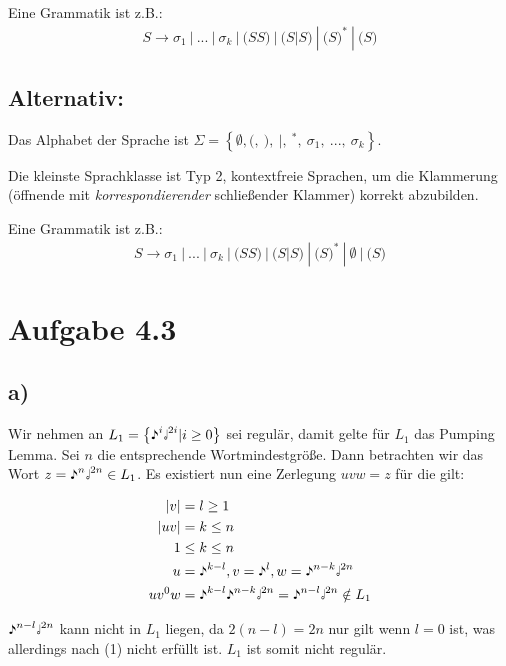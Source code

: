 \documentclass{article}
\begin{document}
Eine Grammatik ist z.B.:
\begin{align*}
S \rightarrow \sigma_1\ |\ ...\ |\ \sigma_k\ |\ \texttt{(}SS\texttt{)}\ |\ \texttt{(}S\texttt{|}S\texttt{)}\ |\ \texttt{(}S\texttt{)}^\texttt{*}\ |\ \texttt{(}S\texttt{)}
\end{align*}

\subsection*{Alternativ:}
Das Alphabet der Sprache ist $\Sigma = \left\{ \emptyset, \texttt{(},\ \texttt{)},\ \texttt{|},\ { }^\texttt{*},\ \sigma_1,\ ...,\ \sigma_k \right\}$.

Die kleinste Sprachklasse ist Typ 2, kontextfreie Sprachen, um die Klammerung (öffnende mit \textit{korrespondierender} schließender Klammer) korrekt abzubilden.

Eine Grammatik ist z.B.:
\begin{align*}
S \rightarrow \sigma_1\ |\ ...\ |\ \sigma_k\ |\ \texttt{(}SS\texttt{)}\ |\ \texttt{(}S\texttt{|}S\texttt{)}\ |\ \texttt{(}S\texttt{)}^\texttt{*}\ |\ \emptyset\ |\ \texttt{(}S\texttt{)}
\end{align*}



\section*{Aufgabe 4.3}
\subsection*{a)}
Wir nehmen an $L_1=\left\{\eighthnote^i\halfnote^{2i} | i \geq 0\right\}$ sei regulär, damit gelte für $L_1$ das Pumping Lemma. Sei $n$ die entsprechende Wortmindestgröße. Dann betrachten wir das Wort $z=\eighthnote^n\halfnote^{2n} \in L_1$. Es existiert nun eine Zerlegung $uvw=z$ für die gilt:

\begin{align}
|v| &= l \geq 1 \\
|uv| &= k \leq n \\
1 &\leq k \leq n \\
u &= \eighthnote^{k-l}, v = \eighthnote^l, w = \eighthnote^{n-k}\halfnote^{2n} \\
uv^0w &= \eighthnote^{k-l}\eighthnote^{n-k}\halfnote^{2n} = \eighthnote^{n-l}\halfnote^{2n}\notin L_1
\end{align}

$\eighthnote^{n-l}\halfnote^{2n}$ kann nicht in $L_1$ liegen, da $2(n-l) = 2n$ nur gilt wenn $l=0$ ist, was allerdings nach (1) nicht erfüllt ist. $L_1$ ist somit nicht regulär.
\setcounter{equation}{0}
\end{document}
